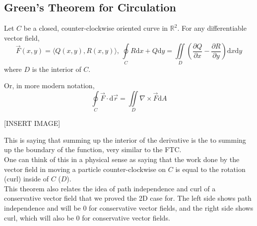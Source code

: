\subsection{Green's Theorem for Circulation}
\begin{theorem}
	Let $C$ be a closed, counter-clockwise oriented curve in $\mathbb{R}^2$. For any differentiable vector field,
	\begin{equation*}
		\vec{F}(x,y) = \langle Q(x,y), R(x,y) \rangle \text{, } \oint\limits_{C}{R\mathrm{d}x + Q\mathrm{d}y} = \iint\limits_{D}{\left(\frac{\partial Q}{\partial x} - \frac{\partial R}{\partial y}\right)\mathrm{d}x\mathrm{d}y}
	\end{equation*}
	where $D$ is the interior of $C$.
\end{theorem}
\noindent
Or, in more modern notation,
\begin{equation*}
	\oint\limits_{C}{\vec{F} \cdot \mathrm{d}\vec{r}} = \iint\limits_{D}{\nabla\times\vec{F}\mathrm{d}A}
\end{equation*}

[INSERT IMAGE]

\noindent
This is saying that summing up the interior of the derivative is the to summing up the boundary of the function, very similar to the FTC.\\
One can think of this in a physical sense as saying that the work done by the vector field in moving a particle counter-clockwise on $C$ is equal to the rotation (curl) inside of  $C$ ($D$).\\
This theorem also relates the idea of path independence and curl of a conservative vector field that we proved the 2D case for. The left side shows path independence and will be 0 for conservative vector fields, and the right side shows curl, which will also be 0 for conservative vector fields.

